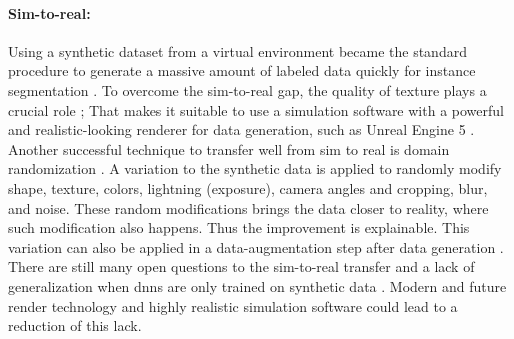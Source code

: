 		\paragraph{Sim-to-real:} Using a synthetic dataset from a virtual environment became the standard procedure to generate a massive amount of labeled data quickly for instance segmentation \cite{Danielczuk2019}\cite{Xie2020}\cite{Xie2021}\cite{Shao2018}\cite{Toda2019}. To overcome the sim-to-real gap, the quality of texture plays a crucial role \cite{Tabak2023}\cite{Martinez2019}; That makes it suitable to use a simulation software with a powerful and realistic-looking renderer for data generation, such as Unreal Engine 5 \cite{Romero2022}.\\
		Another successful technique to transfer well from sim to real is domain randomization \cite{Raj2023}. A variation to the synthetic data is applied to randomly modify shape, texture, colors, lightning (exposure), camera angles and cropping, blur, and noise. These random modifications brings the data closer to reality, where such modification also happens. Thus the improvement is explainable. This variation can also be applied in a data-augmentation step after data generation \cite{Kar2022}.\\
		There are still many open questions to the sim-to-real transfer and a lack of generalization when \ac{dnn}s are only trained on synthetic data \cite{Doersch2019}. Modern and future render technology and highly realistic simulation software could lead to a reduction of this lack.
